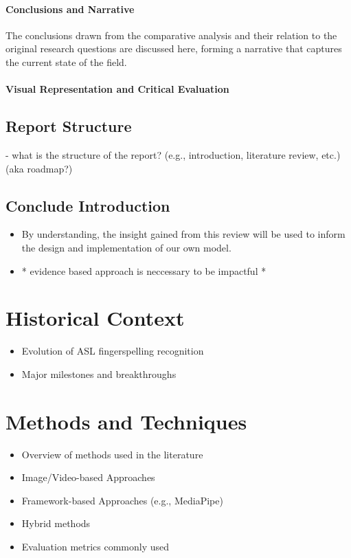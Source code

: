 \paragraph{Conclusions and Narrative}
The conclusions drawn from the comparative analysis and their relation to the original research questions are discussed here, forming a narrative that captures the current state of the field.

\paragraph{Visual Representation and Critical Evaluation}

\begin{landscape}
    
\end{landscape}

\subsection{Report Structure}
- what is the structure of the report? (e.g., introduction, literature review, etc.) (aka roadmap?)

\subsection{Conclude Introduction}

\begin{itemize}
    \item By understanding, the insight gained from this review will be used to inform the design and implementation of our own model.
    \item * evidence based approach is neccessary to be impactful *

\end{itemize}
\section{Historical Context} %
\begin{itemize}
    \item Evolution of ASL fingerspelling recognition
    \item Major milestones and breakthroughs
\end{itemize}

\section{Methods and Techniques} %
\begin{itemize}
    \item Overview of methods used in the literature
    \item Image/Video-based Approaches
    \item Framework-based Approaches (e.g., MediaPipe)
    \item Hybrid methods
    \item Evaluation metrics commonly used
\end{itemize}

